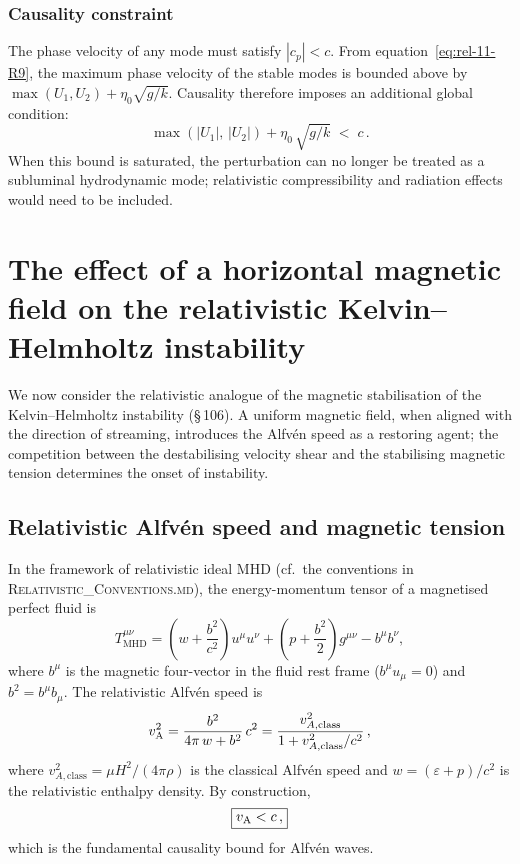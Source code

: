 \subsubsection*{Causality constraint}

The phase velocity of any mode must satisfy $|c_{p}|<c$.  From
equation~\eqref{eq:rel-11-R9}, the maximum phase velocity of the
stable modes is bounded above by $\max(U_{1},U_{2})+\eta_{0}\sqrt{g/k}$.
Causality therefore imposes an additional global condition:
\begin{equation}
\label{eq:rel-11-R12}
\boxed{\max(|U_{1}|,\,|U_{2}|)
+ \eta_{0}\,\sqrt{g/k}\;<\;c\,.}
\end{equation}
When this bound is saturated, the perturbation can no longer be treated
as a subluminal hydrodynamic mode; relativistic compressibility and
radiation effects would need to be included.


\section{The effect of a horizontal magnetic field on the relativistic
  Kelvin--Helmholtz instability}
\label{sec:rel-11-106}

We now consider the relativistic analogue of the magnetic
stabilisation of the Kelvin--Helmholtz instability (\S\,106).  A
uniform magnetic field, when aligned with the direction of streaming,
introduces the Alfv\'en speed as a restoring agent; the competition
between the destabilising velocity shear and the stabilising magnetic
tension determines the onset of instability.

\subsection{Relativistic Alfv\'en speed and magnetic tension}
\label{sec:rel-11-106a}

In the framework of relativistic ideal MHD (cf.\ the conventions in
\textsc{Relativistic\_Conventions.md}), the energy-momentum tensor of
a magnetised perfect fluid is
\begin{equation}
\label{eq:rel-11-R13}
T^{\mu\nu}_{\mathrm{MHD}}
= \left(w+\frac{b^{2}}{c^{2}}\right)u^{\mu}u^{\nu}
+ \left(p+\frac{b^{2}}{2}\right)g^{\mu\nu}
- b^{\mu}b^{\nu},
\end{equation}
where $b^{\mu}$ is the magnetic four-vector in the fluid rest frame
($b^{\mu}u_{\mu}=0$) and $b^{2}=b^{\mu}b_{\mu}$.  The relativistic
Alfv\'en speed is
\begin{equation}
\label{eq:rel-11-R14}
v_{\mathrm{A}}^{2}
= \frac{b^{2}}{4\pi\,w + b^{2}}\,c^{2}
= \frac{v_{A,\mathrm{class}}^{2}}
{1+v_{A,\mathrm{class}}^{2}/c^{2}}\,,
\end{equation}
where $v_{A,\mathrm{class}}^{2}=\mu H^{2}/(4\pi\rho)$ is the
classical Alfv\'en speed and $w=(\varepsilon+p)/c^{2}$ is the
relativistic enthalpy density.  By construction,
\begin{equation}
\label{eq:rel-11-R15}
\boxed{v_{\mathrm{A}} < c\,,}
\end{equation}
which is the fundamental causality bound for Alfv\'en waves.

